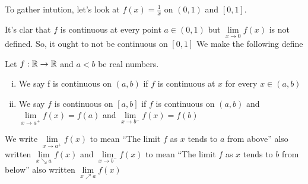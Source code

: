 To gather intution, let's look at $f(x) = \frac{1}{x}$ on $(0, 1)$ and $\left[0, 1\right]$.

\begin{center}
\end{center}

It's clar that $f$ is continuous at every point $a \in (0, 1)$ but $\lim\limits_{x \to 0}f(x)$ is not defined.
So, it ought to not be continuous on $\left[0, 1\right]$
We make the following define

\begin{definition*}[32]
    Let $f: \mathbb R \rightarrow \mathbb R$ and $a < b$ be real numbers.
    \begin{enumerate}[(i)]
        \item We say f is continuous on $(a, b)$ if $f$ is continuous at $x$ for every $x \in (a, b)$
        \item We say $f$ is continuous on $\left[a, b\right]$ if $f$ is continuous on $(a, b)$ and 
        $\lim\limits_{x \to a^+}f(x) = f(a)$ and $\lim\limits_{x \to b^-}f(x) = f(b)$
    \end{enumerate}
    We write $\lim\limits_{x \to a^+} f(x)$ to mean ``The limit $f$ as $x$ tends to $a$ from above''
    also written $\lim\limits_{x \searrow a} f(x)$
    and $\lim\limits_{x \to b^-} f(x)$ to mean ``The limit $f$ as $x$ tends to $b$ from below''
    also written $\lim\limits_{x \nearrow a} f(x)$
\end{definition*}

